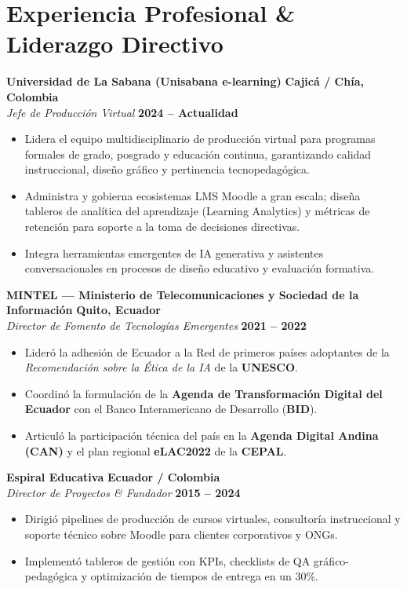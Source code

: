 \documentclass[10pt,a4paper]{article}
\begin{document}
\section{Experiencia Profesional \& Liderazgo Directivo}

\textbf{Universidad de La Sabana (Unisabana e-learning)} \hfill \textbf{Cajicá / Chía, Colombia}\\
\textit{Jefe de Producción Virtual} \hfill \textbf{2024 – Actualidad}
\begin{itemize}
  \item Lidera el equipo multidisciplinario de producción virtual para programas formales de grado, posgrado y educación continua, garantizando calidad instruccional, diseño gráfico y pertinencia tecnopedagógica.
  \item Administra y gobierna ecosistemas LMS Moodle a gran escala; diseña tableros de analítica del aprendizaje (Learning Analytics) y métricas de retención para soporte a la toma de decisiones directivas.
  \item Integra herramientas emergentes de IA generativa y asistentes conversacionales en procesos de diseño educativo y evaluación formativa.
\end{itemize}

\vspace{4pt}

\textbf{MINTEL — Ministerio de Telecomunicaciones y Sociedad de la Información} \hfill \textbf{Quito, Ecuador}\\
\textit{Director de Fomento de Tecnologías Emergentes} \hfill \textbf{2021 – 2022}
\begin{itemize}
  \item Lideró la adhesión de Ecuador a la Red de primeros países adoptantes de la \textit{Recomendación sobre la Ética de la IA} de la \textbf{UNESCO}.
  \item Coordinó la formulación de la \textbf{Agenda de Transformación Digital del Ecuador} con el Banco Interamericano de Desarrollo (\textbf{BID}).
  \item Articuló la participación técnica del país en la \textbf{Agenda Digital Andina (CAN)} y el plan regional \textbf{eLAC2022} de la \textbf{CEPAL}.
\end{itemize}

\vspace{4pt}

\textbf{Espiral Educativa} \hfill \textbf{Ecuador / Colombia}\\
\textit{Director de Proyectos \& Fundador} \hfill \textbf{2015 – 2024}
\begin{itemize}
  \item Dirigió pipelines de producción de cursos virtuales, consultoría instruccional y soporte técnico sobre Moodle para clientes corporativos y ONGs.
  \item Implementó tableros de gestión con KPIs, checklists de QA gráfico-pedagógica y optimización de tiempos de entrega en un 30\%.
\end{itemize}
\end{document}
